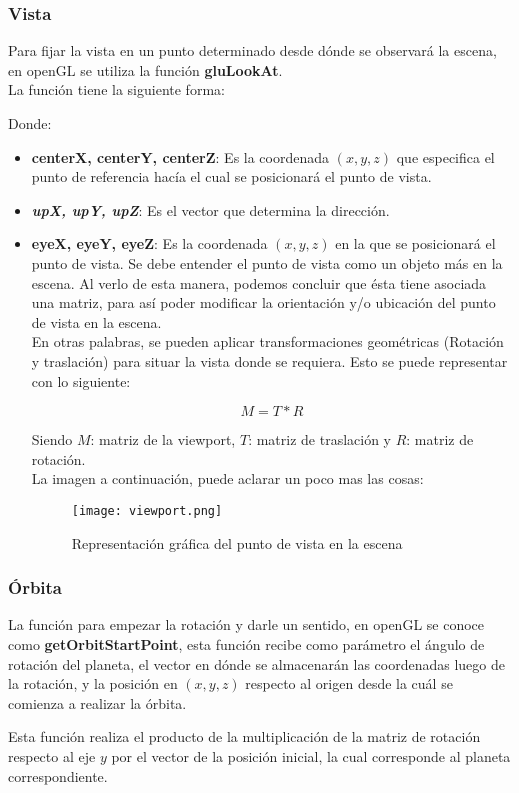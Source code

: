 \documentclass[12pt,journal,compsoc]{IEEEtran}
\begin{document}
\subsubsection{Vista}
Para fijar la vista en un punto determinado desde dónde se observará la escena, en openGL se utiliza la función \textbf{gluLookAt}. \\La función tiene la siguiente forma:
%

%
Donde:
%
\begin{itemize}
	\item \textbf{centerX, centerY, centerZ}: Es la coordenada $(x,y,z)$ que especifica el punto de referencia hacía el cual se posicionará el punto de vista.
	\item \textbf{\textit{upX, upY, upZ}}: Es el vector que determina la dirección.
	\item \textbf{eyeX, eyeY, eyeZ}: Es la coordenada $(x,y,z)$ en la que se posicionará el punto de vista.
%
Se debe entender el punto de vista como un objeto más en la escena. Al verlo de esta manera, podemos concluir que ésta tiene asociada una matriz, para así poder modificar la orientación y/o ubicación del punto de vista en la escena.\\
En otras palabras, se pueden aplicar transformaciones geométricas (Rotación y traslación)  para situar la  vista donde se requiera. Esto se puede representar con lo siguiente:

\[
	M = T * R
\]

Siendo $M$: matriz de la viewport, $T$: matriz de traslación y $R$: matriz de rotación.\\La imagen a continuación, puede aclarar un poco mas las cosas:

\begin{figure}[h!]
	\texttt{[image: viewport.png]}
	\centering
	\caption{Representación gráfica del punto de vista en la escena}
\end{figure}
%
\end{itemize}
\subsubsection{Órbita}
La función para empezar la rotación y darle un sentido, en openGL se conoce como \textbf{getOrbitStartPoint}, esta función recibe como parámetro el ángulo de rotación del planeta, el vector en dónde se almacenarán las coordenadas luego de la rotación, y la posición en $(x,y,z)$ respecto al origen desde la cuál se comienza a realizar la órbita.
%

%
Esta función realiza el producto de la multiplicación de la matriz de rotación respecto al eje $y$ por el vector de la posición inicial, la cual corresponde al planeta correspondiente.
\end{document}
